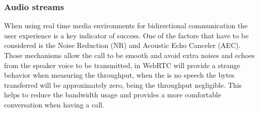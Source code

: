 \subsubsection{Audio streams}

When using real time media environments for bidirectional communication the user experience is a key indicator of success. One of the factors that have to be considered is the Noise Reduction (NR) and Acoustic Echo Canceler (AEC). Those mechanisms allow the call to be smooth and avoid extra noises and echoes from the speaker voice to be transmitted, in WebRTC will provide a strange behavior when measuring the throughput, when the is no speech the bytes transferred will be approximately zero, being the throughput negligible. This helps to reduce the bandwidth usage and provides a more comfortable conversation when having a call.

